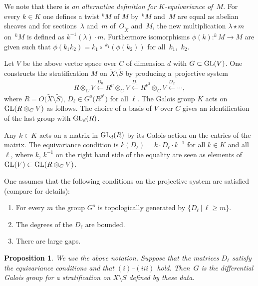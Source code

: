 \documentclass[pdftex]{sigma}
\numberwithin{equation}{section}
\newtheorem{Proposition}[Theorem]{Proposition}
\begin{document}
We note that there is {\it an alternative definition for $K$-equivariance of~$M$}. For every $k\in K$ one defines a twist $^kM$ of $M$ by~$^kM$ and~$M$ are equal as abelian sheaves and for sections~$\lambda$ and~$m$ of~$O_{\tilde{X}}$ and~$M$, the new multiplication $\lambda \star m$ on~$^kM$ is defined as $k^{-1}(\lambda )\cdot m$. Furthermore isomorphisms $\phi (k)\colon ^kM\rightarrow M$ are given such that $\phi(k_1k_2)=k_1\circ \ ^{k_1}(\phi (k_2))$ for all~$k_1$,~$k_2$.

 Let $V$ be the above vector space over $C$ of dimension $d$ with $G\subset {\rm GL}(V)$. One constructs the stratification $M$ on $\tilde{X}\setminus \tilde{S}$ by producing a~projective system
 \begin{gather*} R\otimes_CV\overset{D_0}{\leftarrow} R^p\otimes_CV\overset{D_1}{\leftarrow} R^{p^2}\otimes_CV \overset{D_2}{\leftarrow} \cdots , \end{gather*}
 where $R=O\big(\tilde{X} \setminus \tilde{S}\big)$, $D_\ell \in G^o\big(R^{p^\ell}\big)$ for all $\ell$. The Galois group $K$ acts on ${\rm GL}(R\otimes _CV)$ as follows. The choice of a basis of $V$ over $C$ gives an identification of the last group with ${\rm GL}_d(R)$.

 Any $k\in K$ acts on a matrix in ${\rm GL}_d(R)$ by its Galois action on the entries of the matrix. The equivariance condition is $k(D_\ell)=k\cdot D_\ell \cdot k^{-1}$ for all $k\in K$ and all $\ell$, where $k$, $k^{-1}$ on the right hand side of the equality are seen as elements of ${\rm GL}(V)\subset {\rm GL}(R\otimes _CV)$.

 One assumes that the following conditions on the projective system are satisfied (compare \cite[Lemma 7.4]{Ma-vdP1} for details):
\begin{enumerate}\itemsep=0pt
\item[(i)] For every $m$ the group $G^o$ is topologically generated by $\{D_\ell \, |\, \ell \geq m\}$.
\item[(ii)] The degrees of the $D_\ell$ are bounded.
\item[(iii)] There are large gaps.
\end{enumerate}

 \begin{Proposition}\label{2.8} We use the above notation. Suppose that the matrices $D_\ell$ satisfy the equivariance conditions and that $(i)$--$(iii)$ hold. Then~$G$ is the differential Galois group for a stratification on $X\setminus S$ defined by these data.
\end{Proposition}
\end{document}
